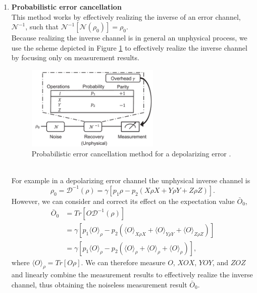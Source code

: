 \begin{enumerate}
    \item \textbf{Probabilistic error cancellation} \\
    This method works by effectively realizing the inverse of an error channel, $\mathcal{N}^{-1}$, such that $\mathcal{N}^{-1} [ \mathcal{N} (\rho_0) ] = \rho_0$. \\
    Because realizing the inverse channel is in general an unphysical process, we use the scheme depicted in Figure \ref{Probabilistic error cancellation} to effectively realize the inverse channel by focusing only on measurement results.
    \begin{figure}[ht]
    \centering
    \includegraphics[width=0.6\textwidth]{figures/Probabilistic error cancellation.png}
    \caption{Probabilistic error cancellation method for a depolarizing error \cite{Tilly2021Nov}.} \label{Probabilistic error cancellation}
    \end{figure} \\
    For example in a depolarizing error channel the unphysical inverse channel is
    \begin{equation}
        \rho_0 = \mathcal{D}^{-1}(\rho) = \gamma [p_1\rho - p_2(X\rho X + Y\rho Y + Z\rho Z)].
    \end{equation}
    However, we can consider and correct its effect on the expectation value $\bar{O}_0$,
    \begin{align}
        \bar{O}_0 & = Tr[O\mathcal{D}^{-1}(\rho)] \\
        & = \gamma [p_1 \langle O \rangle_{\rho} - p_2(\langle O \rangle_{X\rho X} + \langle O \rangle_{Y\rho Y} + \langle O \rangle_{Z\rho Z})] \\
        & = \gamma [p_1 \langle O \rangle_{\rho} - p_2(\langle O \rangle_{\rho} + \langle O \rangle_{\rho} + \langle O \rangle_{\rho})],
    \end{align}
    where $\langle O \rangle_{\rho} = Tr[O\rho]$. We can therefore measure $O$, $XOX$, $YOY$, and $ZOZ$ and linearly combine the measurement results to effectively realize the inverse channel, thus obtaining the noiseless measurement result $\bar{O}_0$. \\

\end{enumerate}
